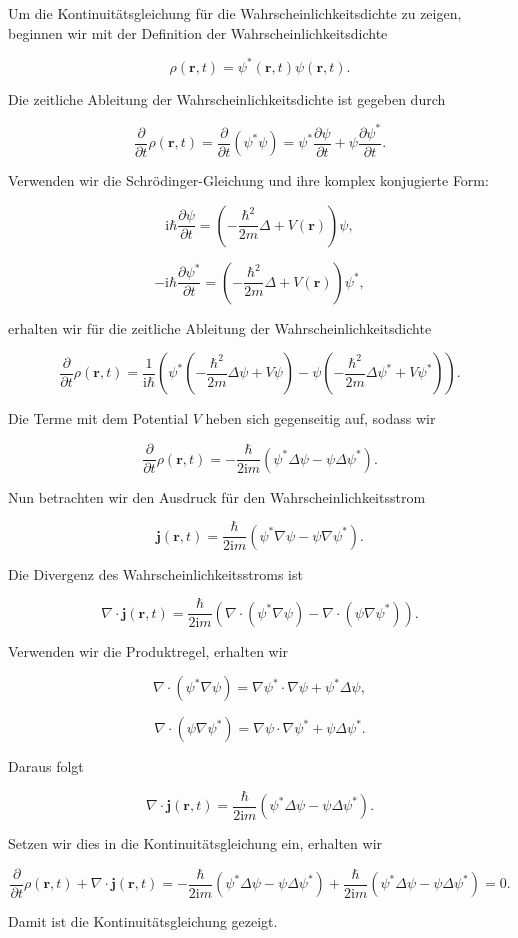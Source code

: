 Um die Kontinuitätsgleichung für die Wahrscheinlichkeitsdichte zu zeigen, beginnen wir mit der Definition der Wahrscheinlichkeitsdichte 

\[
\rho(\mathbf{r}, t) = \psi^*(\mathbf{r}, t) \psi(\mathbf{r}, t).
\]

Die zeitliche Ableitung der Wahrscheinlichkeitsdichte ist gegeben durch

\[
\frac{\partial}{\partial t} \rho(\mathbf{r}, t) = \frac{\partial}{\partial t} (\psi^* \psi) = \psi^* \frac{\partial \psi}{\partial t} + \psi \frac{\partial \psi^*}{\partial t}.
\]

Verwenden wir die Schrödinger-Gleichung und ihre komplex konjugierte Form:

\[
\mathrm{i} \hbar \frac{\partial \psi}{\partial t} = \left(-\frac{\hbar^2}{2m} \Delta + V(\mathbf{r})\right) \psi,
\]

\[
-\mathrm{i} \hbar \frac{\partial \psi^*}{\partial t} = \left(-\frac{\hbar^2}{2m} \Delta + V(\mathbf{r})\right) \psi^*,
\]

erhalten wir für die zeitliche Ableitung der Wahrscheinlichkeitsdichte

\[
\frac{\partial}{\partial t} \rho(\mathbf{r}, t) = \frac{1}{\mathrm{i} \hbar} \left( \psi^* \left(-\frac{\hbar^2}{2m} \Delta \psi + V \psi \right) - \psi \left(-\frac{\hbar^2}{2m} \Delta \psi^* + V \psi^* \right) \right).
\]

Die Terme mit dem Potential \( V \) heben sich gegenseitig auf, sodass wir

\[
\frac{\partial}{\partial t} \rho(\mathbf{r}, t) = -\frac{\hbar}{2 \mathrm{i} m} \left( \psi^* \Delta \psi - \psi \Delta \psi^* \right).
\]

Nun betrachten wir den Ausdruck für den Wahrscheinlichkeitsstrom

\[
\mathbf{j}(\mathbf{r}, t) = \frac{\hbar}{2 \mathrm{i} m} \left( \psi^* \nabla \psi - \psi \nabla \psi^* \right).
\]

Die Divergenz des Wahrscheinlichkeitsstroms ist

\[
\nabla \cdot \mathbf{j}(\mathbf{r}, t) = \frac{\hbar}{2 \mathrm{i} m} \left( \nabla \cdot (\psi^* \nabla \psi) - \nabla \cdot (\psi \nabla \psi^*) \right).
\]

Verwenden wir die Produktregel, erhalten wir

\[
\nabla \cdot (\psi^* \nabla \psi) = \nabla \psi^* \cdot \nabla \psi + \psi^* \Delta \psi,
\]

\[
\nabla \cdot (\psi \nabla \psi^*) = \nabla \psi \cdot \nabla \psi^* + \psi \Delta \psi^*.
\]

Daraus folgt

\[
\nabla \cdot \mathbf{j}(\mathbf{r}, t) = \frac{\hbar}{2 \mathrm{i} m} \left( \psi^* \Delta \psi - \psi \Delta \psi^* \right).
\]

Setzen wir dies in die Kontinuitätsgleichung ein, erhalten wir

\[
\frac{\partial}{\partial t} \rho(\mathbf{r}, t) + \nabla \cdot \mathbf{j}(\mathbf{r}, t) = -\frac{\hbar}{2 \mathrm{i} m} \left( \psi^* \Delta \psi - \psi \Delta \psi^* \right) + \frac{\hbar}{2 \mathrm{i} m} \left( \psi^* \Delta \psi - \psi \Delta \psi^* \right) = 0.
\]

Damit ist die Kontinuitätsgleichung gezeigt.